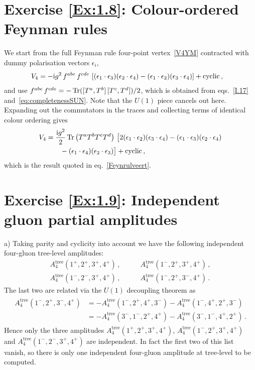 
\section*{Exercise \ref{Ex:1.8}: Colour-ordered Feynman rules}
\label{Sol:1.8}

We start from the full Feynman rule four-point vertex~\eqref{V4YM} contracted with dummy polarisation
vectors $\epsilon_{i}$,
%
\begin{align}
V_{4}&= -\mathrm{i} g^2\, f^{abe}\, f^{cde}\, \left[ (\epsilon_{1}\cdot\epsilon_{3})(\epsilon_{2}\cdot\epsilon_{4})- (\epsilon_{1}\cdot\epsilon_{2})(\epsilon_{3}\cdot\epsilon_{4}) \right]
+\text{cyclic}\,,
\end{align}
%
and use $f^{abe}\, f^{cde}=-\mathop{\mathrm{Tr}}([T^{a},T^{b}]\, [T^{c},T^{d}]) / 2$, which is
obtained from eqs.~\eqref{I.17} and~\eqref{eq:completenessSUN}. Note that the $U(1)$ piece cancels out here. 
Expanding out the commutators in the traces and collecting terms of identical colour
ordering gives
%
\begin{align}
V_{4}&= \frac{\mathrm{i} g^{2}}{2} \mathop{\mathrm{Tr}}\left(T^{a}T^{b}T^{c}T^{d}\right)\, \bigl[ 2(\epsilon_{1}\cdot\epsilon_{2})(\epsilon_{3}\cdot\epsilon_{4})
-(\epsilon_{1}\cdot\epsilon_{3})(\epsilon_{2}\cdot\epsilon_{4})\nonumber\\ & \qquad -(\epsilon_{1}\cdot\epsilon_{4})(\epsilon_{2}\cdot\epsilon_{3}) \bigr]+\text{cyclic}\, ,
\end{align}
which is the result quoted in eq.~\eqref{Feynrulveert}.




\section*{Exercise \ref{Ex:1.9}: Independent gluon partial amplitudes}
\label{Sol:1.9}

a) Taking parity and cyclicity into account we have the following independent four-gluon tree-level amplitudes:
\begin{align*}
A^{\text{tree}}_{4}(1^{+},2^{+},3^{+},4^{+}) \, ,\qquad & A^{\text{tree}}_{4}(1^{-},2^{+},3^{+},4^{+}) \, ,
\\
A^{\text{tree}}_{4}(1^{-},2^{-},3^{+},4^{+})\, , \qquad & A^{\text{tree}}_{4}(1^{-},2^{+},3^{-},4^{+})\, .
\end{align*}
The last two are related via the $U(1)$ decoupling theorem as 
%
\begin{align}
\begin{aligned}
A^{\text{tree}}_{4}(1^{-},2^{+},3^{-},4^{+}) &= - A^{\text{tree}}_{4}(1^{-},2^{+},4^{+},3^{-}) - A^{\text{tree}}_{4}(1^{-},4^{+},2^{+},3^{-}) \\
&= - A^{\text{tree}}_{4}(3^{-},1^{-},2^{+},4^{+}) - A^{\text{tree}}_{4}(3^{-},1^{-},4^{+},2^{+}) \, .
\end{aligned}
\end{align}
%
Hence only the three amplitudes $A^{\text{tree}}_{4}(1^{+},2^{+},3^{+},4^{+})$,
$A^{\text{tree}}_{4}(1^{-},2^{+},3^{+},4^{+})$ and $A^{\text{tree}}_{4}(1^{-},2^{-},3^{+},4^{+}) $
are independent. In fact the first two of this list vanish, so there is only one independent
four-gluon amplitude at tree-level to be computed.

